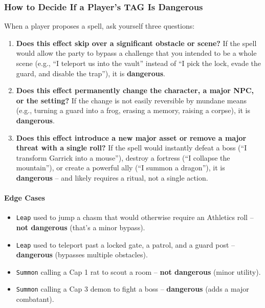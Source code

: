 \subsubsection*{How to Decide If a Player's TAG Is Dangerous}
When a player proposes a spell, ask yourself three questions:

\begin{enumerate}
  \item \textbf{Does this effect skip over a significant obstacle or scene?}  
  If the spell would allow the party to bypass a challenge that you intended to be a whole scene (e.g., ``I teleport us into the vault'' instead of ``I pick the lock, evade the guard, and disable the trap''), it is \textbf{dangerous}.

  \item \textbf{Does this effect permanently change the character, a major NPC, or the setting?}  
  If the change is not easily reversible by mundane means (e.g., turning a guard into a frog, erasing a memory, raising a corpse), it is \textbf{dangerous}.

  \item \textbf{Does this effect introduce a new major asset or remove a major threat with a single roll?}  
  If the spell would instantly defeat a boss (``I transform Garrick into a mouse''), destroy a fortress (``I collapse the mountain''), or create a powerful ally (``I summon a dragon''), it is \textbf{dangerous} -- and likely requires a ritual, not a single action.
\end{enumerate}

\paragraph{Edge Cases}
\begin{itemize}
  \item \texttt{Leap} used to jump a chasm that would otherwise require an Athletics roll -- \textbf{not dangerous} (that's a minor bypass).  
  \item \texttt{Leap} used to teleport past a locked gate, a patrol, and a guard post -- \textbf{dangerous} (bypasses multiple obstacles).  
  \item \texttt{Summon} calling a Cap 1 rat to scout a room -- \textbf{not dangerous} (minor utility).  
  \item \texttt{Summon} calling a Cap 3 demon to fight a boss -- \textbf{dangerous} (adds a major combatant).
\end{itemize}


